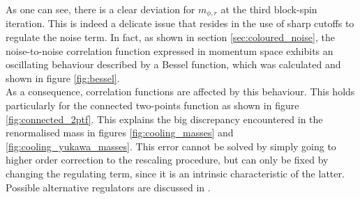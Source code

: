 As one can see, there is a clear deviation for $m_{\phi, r}$ at the third block-spin iteration.
This is indeed a delicate issue that resides in the use of sharp cutoffs to regulate the noise term. In fact, as shown in section \ref{sec:coloured_noise}, the noise-to-noise correlation function expressed in momentum space exhibits an oscillating behaviour described by a Bessel function, which was calculated and shown in figure \ref{fig:bessel}. \\
As a consequence, correlation functions are affected by this behaviour. This holds particularly for the connected two-points function as shown in figure \ref{fig:connected_2ptf}. This explains the big discrepancy encountered in the renormalised mass in figures \ref{fig:cooling_masses} and \ref{fig:cooling_yukawa_masses}. This error cannot be solved
by simply going to higher order correction to the rescaling procedure, but can only be fixed by changing the regulating term, since it is an intrinsic characteristic of the latter. Possible alternative regulators are discussed in \cite{Pawlowski2017CoolingNoise}.

